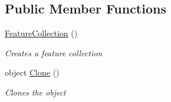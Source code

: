 \subsection*{Public Member Functions}
\begin{DoxyCompactItemize}
\item 
\hyperlink{class_hel_project_1_1_features_1_1_feature_collection_a8494a00531f9807cb6e5c57137a12ee8}{Feature\+Collection} ()
\begin{DoxyCompactList}\small\item\em Creates a feature collection \end{DoxyCompactList}\item 
object \hyperlink{class_hel_project_1_1_features_1_1_feature_collection_a920d45565d353cc73c05055018d498eb}{Clone} ()
\begin{DoxyCompactList}\small\item\em Clones the object \end{DoxyCompactList}\end{DoxyCompactItemize}
